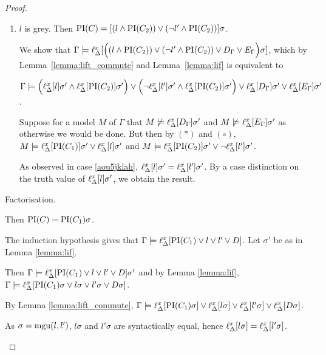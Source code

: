 \begin{proof}
\begin{description}
\begin{enumerate}
				\item $l$ is grey. Then $\operatorname{PI}(C) = [(l \land \operatorname{PI}(C_2) ) \lor (\lnot l' \land \operatorname{PI}(C_2))]\sigma$.

					We show that $\Gamma \models \ell_{\Delta}^{x}[ \Big((l \land \operatorname{PI}(C_2) ) \lor (\lnot l' \land \operatorname{PI}(C_2)) \lor D_\Gamma \lor E_\Gamma\Big)\sigma]$, which by Lemma~\ref{lemma:lift_commute} and Lemma~\ref{lemma:lif} is equivalent to

					$\Gamma \models \Big(\ell_{\Delta}^{x}[l]\sigma' \land \ell_{\Delta}^{x}[\operatorname{PI}(C_2)]\sigma'\Big)\lor\Big(\lnot \ell_{\Delta}^{x}[l']\sigma' \land \ell_{\Delta}^{x}[\operatorname{PI}(C_2)]\sigma'\Big)\lor\ell_{\Delta}^{x}[D_\Gamma]\sigma' \lor \ell_{\Delta}^{x}[E_\Gamma]\sigma'$.

					Suppose for a model $M$ of $\Gamma$ that  $M \not\models \ell_{\Delta}^{x}[D_\Gamma]\sigma'$ and $M\not\models \ell_{\Delta}^{x}[E_\Gamma]\sigma'$ as otherwise we would be done.
					But then by $(*)$ and $(\circ)$,
					$M \models \ell_{\Delta}^{x}[\operatorname{PI}(C_1)]\sigma' \lor \ell_{\Delta}^{x}[l]\sigma'$ and
					$M \entails\nolinebreak \lifdelta{\PI(C_2)}\sigma' \lor \lnot\lifdelta{l'}\sigma'$.

					As observed in case \ref{aou5jklah}, $\ell_{\Delta}^{x}[l]\sigma' = \ell_{\Delta}^{x}[l']\sigma'$. By a case distinction on the truth value of $\ell_{\Delta}^{x}[l]\sigma'$, we obtain the result.



			\end{enumerate}

		\item{Factorisation.}
			\begin{prooftree}
			\end{prooftree}
			Then $\operatorname{PI}(C) = \operatorname{PI}(C_1)\sigma$.

			The induction hypothesis gives that
			$\Gamma \models \ell_{\Delta}^{x}[\operatorname{PI}(C_1) \lor l \lor l' \lor D]$.
			Let $\sigma'$ be as in Lemma \ref{lemma:lif}.

			Then $\Gamma \models \ell_{\Delta}^{x}[\operatorname{PI}(C_1) \lor l \lor l' \lor D]\sigma'$ and by Lemma \ref{lemma:lif},
			$\Gamma \models \ell_{\Delta}^{x}[\operatorname{PI}(C_1)\sigma \lor l\sigma \lor l'\sigma \lor D\sigma]$.

			By Lemma \ref{lemma:lift_commute},
			$\Gamma \models \ell_{\Delta}^{x}[\operatorname{PI}(C_1)\sigma] \lor \ell_{\Delta}^{x}[l\sigma] \lor \ell_{\Delta}^{x}[l'\sigma] \lor \ell_{\Delta}^{x}[D\sigma]$.

			As $\sigma = \operatorname{mgu}(l, l')$, $l\sigma$ and $l'\sigma$ are syntactically equal, hence $\ell_{\Delta}^{x}[l\sigma] = \ell_{\Delta}^{x}[l'\sigma]$.%


\end{description}
\end{proof}
